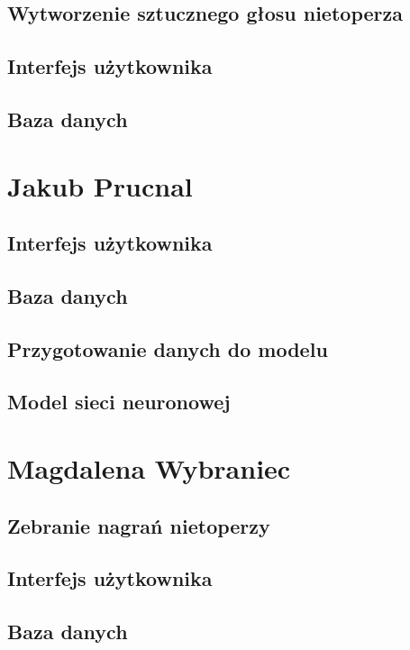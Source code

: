 \documentclass{sprz}
\begin{document}
\subsection{Wytworzenie sztucznego głosu nietoperza}

\subsection{Interfejs użytkownika}

\subsection{Baza danych}

\section{Jakub Prucnal}

\subsection{Interfejs użytkownika}

\subsection{Baza danych}

\subsection{Przygotowanie danych do modelu}

\subsection{Model sieci neuronowej}

\section{Magdalena Wybraniec}

\subsection{Zebranie nagrań nietoperzy}

\subsection{Interfejs użytkownika}

\subsection{Baza danych}
\end{document}
